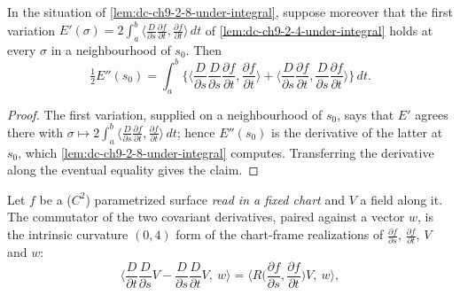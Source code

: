 \begin{lemma}
  \label{lem:dc-ch9-2-8-energy-snd-deriv}
  \leanok
  In the situation of \cref{lem:dc-ch9-2-8-under-integral}, suppose moreover that the first
  variation $E'(\sigma)=2\int_a^b\langle\frac{D}{\partial s}\frac{\partial f}{\partial t},
  \frac{\partial f}{\partial t}\rangle\,dt$ of \cref{lem:dc-ch9-2-4-under-integral} holds at
  every $\sigma$ in a neighbourhood of $s_0$. Then
  $$
  \tfrac12 E''(s_0)
  = \int_a^b\Big\{\Big\langle\frac{D}{\partial s}\frac{D}{\partial s}\frac{\partial f}{\partial t},
    \frac{\partial f}{\partial t}\Big\rangle
    + \Big\langle\frac{D}{\partial s}\frac{\partial f}{\partial t},
      \frac{D}{\partial s}\frac{\partial f}{\partial t}\Big\rangle\Big\}\,dt .
  $$

\end{lemma}
\begin{proof}
  \leanok
  \sketch
  The first variation, supplied on a neighbourhood of $s_0$, says that $E'$ agrees there with
  $\sigma\mapsto 2\int_a^b\langle\frac{D}{\partial s}\frac{\partial f}{\partial t},\frac{\partial f}{\partial t}\rangle\,dt$;
  hence $E''(s_0)$ is the derivative of the latter at $s_0$, which
  \cref{lem:dc-ch9-2-8-under-integral} computes. Transferring the derivative along the
  eventual equality gives the claim.
\end{proof}
\begin{lemma}
  \label{lem:dc-ch9-2-8-curvature-substitution}
  \leanok
  Let $f$ be a ($C^2$) parametrized surface \emph{read in a fixed chart} and $V$ a field along
  it. The commutator of the two covariant derivatives, paired against a vector $w$, is the
  intrinsic curvature $(0,4)$ form of the chart-frame realizations of $\frac{\partial f}{\partial s}$,
  $\frac{\partial f}{\partial t}$, $V$ and $w$:
  $$
  \Big\langle\frac{D}{\partial t}\frac{D}{\partial s}V - \frac{D}{\partial s}\frac{D}{\partial t}V,\ w\Big\rangle
    = \Big\langle R\Big(\frac{\partial f}{\partial s},\frac{\partial f}{\partial t}\Big)V,\ w\Big\rangle,
  $$
\end{lemma}
